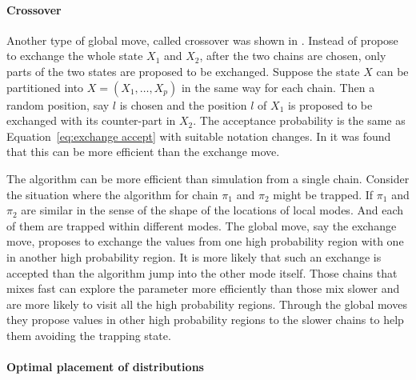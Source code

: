 \paragraph{Crossover}

Another type of global move, called crossover was shown in
\cite{Liang:2001dc}. Instead of propose to exchange the whole state $X_1$ and
$X_2$, after the two chains are chosen, only parts of the two states are
proposed to be exchanged. Suppose the state $X$ can be partitioned into $X =
(X_1,\dots,X_p)$ in the same way for each chain. Then a random position, say
$l$ is chosen and the position $l$ of $X_1$ is proposed to be exchanged with
its counter-part in $X_2$. The acceptance probability is the same as
Equation~\eqref{eq:exchange accept} with suitable notation changes. In
\cite{Jasra:2007in} it was found that this can be more efficient than the
exchange move.

The algorithm can be more efficient than simulation from a single chain.
Consider the situation where the \mcmc algorithm for chain $\pi_1$ and $\pi_2$
might be trapped. If $\pi_1$ and $\pi_2$ are similar in the sense of the shape
of the locations of local modes. And each of them are trapped within different
modes. The global move, say the exchange move, proposes to exchange the values
from one high probability region with one in another high probability region.
It is more likely that such an exchange is accepted than the \mcmc algorithm
jump into the other mode itself. Those chains that mixes fast can explore the
parameter more efficiently than those mix slower and are more likely to visit
all the high probability regions. Through the global moves they propose values
in other high probability regions to the slower chains to help them avoiding
the trapping state.

\paragraph{Optimal placement of distributions}

